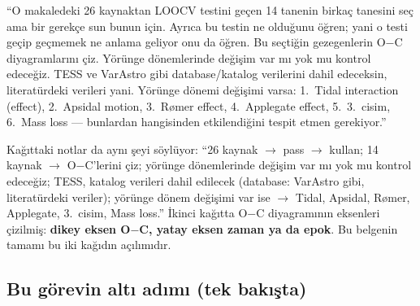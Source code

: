 \documentclass[11pt,a4paper]{article}
\begin{document}
\begin{hoca}
“O makaledeki 26 kaynaktan LOOCV testini geçen 14 tanenin birkaç tanesini seç ama bir gerekçe sun bunun için.
Ayrıca bu testin ne olduğunu öğren; yani o testi geçip geçmemek ne anlama geliyor onu da öğren.
Bu seçtiğin gezegenlerin O$-$C diyagramlarını çiz. Yörünge dönemlerinde değişim var mı yok mu kontrol edeceğiz.
TESS ve VarAstro gibi database/katalog verilerini dahil edeceksin, literatürdeki verileri yani.
Yörünge dönemi değişimi varsa: 1.~Tidal interaction (effect), 2.~Apsidal motion, 3.~Rømer effect,
4.~Applegate effect, 5.~3.~cisim, 6.~Mass loss — bunlardan hangisinden etkilendiğini tespit etmen gerekiyor.”
\end{hoca}

Kağıttaki notlar da aynı şeyi söylüyor: “26 kaynak $\rightarrow$ pass $\rightarrow$ kullan; 14 kaynak $\rightarrow$
O$-$C'lerini çiz; yörünge dönemlerinde değişim var mı yok mu kontrol edeceğiz; TESS, katalog verileri dahil edilecek
(database: VarAstro gibi, literatürdeki veriler); yörünge dönem değişimi var ise $\rightarrow$ Tidal, Apsidal,
Rømer, Applegate, 3.~cisim, Mass loss.” İkinci kağıtta O$-$C diyagramının eksenleri çizilmiş:
\textbf{dikey eksen O$-$C, yatay eksen zaman ya da epok}. Bu belgenin tamamı bu iki kağıdın açılımıdır.

\subsection{Bu görevin altı adımı (tek bakışta)}
\end{document}
